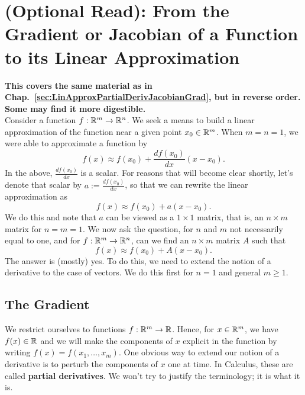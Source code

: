 \section{(Optional Read): From the Gradient or Jacobian of a Function to its Linear Approximation}
\label{sec:optionalread:GradjacobianLinear}

\textbf{This covers the same material as in Chap.~\ref{sec:LinApproxPartialDerivJacobianGrad}, but in reverse order. Some may find it more digestible.}\\


Consider a function $f:\mathbb R^m \to \mathbb R^n$. We seek a means to build a linear approximation of the function near a given point $x_0 \in \mathbb R^m$. When $m=n=1$, we were able to approximate a function by 
$$ f(x) \approx f(x_0) + \frac{df(x_0)}{dx} (x-x_0).$$
In the above, $ \frac{df(x_0)}{dx}$ is a scalar. For reasons that will become clear shortly, let's denote that scalar by $a:= \frac{df(x_0)}{dx}$, so that we can rewrite the linear approximation as
\begin{equation}
    \label{eq:optional:LinearModelofNLfunction}
      f(x) \approx f(x_0) + a (x-x_0).
\end{equation}
We do this and note that $a$ can be viewed as a $1 \times 1$ matrix, that is, an $n \times m$ matrix for $n=m=1$. We now ask the question, for $n$ and $m$ not necessarily equal to one, and for $f:\mathbb R^m \to \mathbb R^n$, can we find an $n \times m$ matrix $A$ such that
\begin{equation}
    \label{eq:optional:LinearModelofNLfunction02}
      f(x) \approx f(x_0) + A (x-x_0).
\end{equation}
The answer is (mostly) yes. To do this, we need to extend the notion of a derivative to the case of vectors. We do this first for $n=1$ and general $m\ge 1$.

\subsection{The Gradient}

We restrict ourselves to functions $f:\mathbb R^m \to \mathbb R$. Hence, for $x \in \mathbb R^m$, we have $f(x) \in \mathbb R$ and we will make the components of $x$ explicit in the function by writing $f(x)=f(x_1, \ldots, x_m).$ One obvious way to extend our notion of a derivative is to perturb the components of $x$ one at time. In Calculus, these are called \textbf{partial derivatives}. We won't try to justify the terminology; it is what it is. \\

